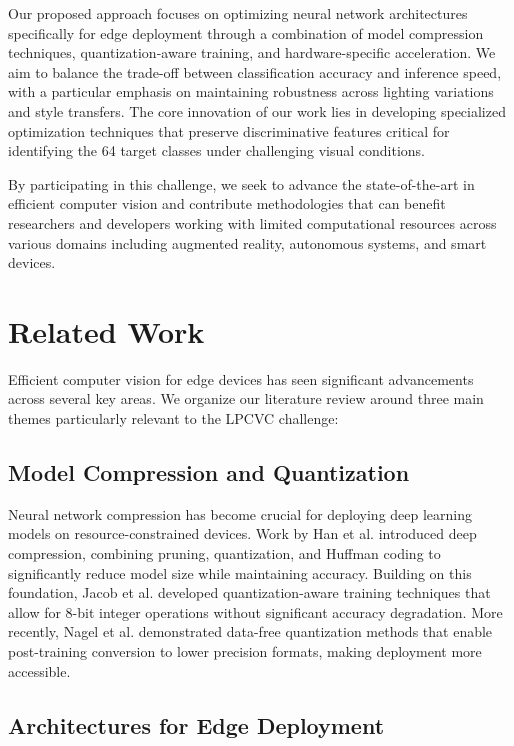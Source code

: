 \documentclass[11pt, oneside]{article}   	%
\begin{document}
Our proposed approach focuses on optimizing neural network architectures specifically for edge deployment through a combination of model compression techniques, quantization-aware training, and hardware-specific acceleration. We aim to balance the trade-off between classification accuracy and inference speed, with a particular emphasis on maintaining robustness across lighting variations and style transfers. The core innovation of our work lies in developing specialized optimization techniques that preserve discriminative features critical for identifying the 64 target classes under challenging visual conditions.

By participating in this challenge, we seek to advance the state-of-the-art in efficient computer vision and contribute methodologies that can benefit researchers and developers working with limited computational resources across various domains including augmented reality, autonomous systems, and smart devices.

\section*{Related Work}

Efficient computer vision for edge devices has seen significant advancements across several key areas. We organize our literature review around three main themes particularly relevant to the LPCVC challenge:



\subsection*{Model Compression and Quantization}

Neural network compression has become crucial for deploying deep learning models on resource-constrained devices. Work by Han et al. \cite{han2016deep} introduced deep compression, combining pruning, quantization, and Huffman coding to significantly reduce model size while maintaining accuracy. Building on this foundation, Jacob et al. \cite{jacob2018quantization} developed quantization-aware training techniques that allow for 8-bit integer operations without significant accuracy degradation. More recently, Nagel et al. \cite{nagel2021white} demonstrated data-free quantization methods that enable post-training conversion to lower precision formats, making deployment more accessible.

\subsection*{Architectures for Edge Deployment}
\end{document}
